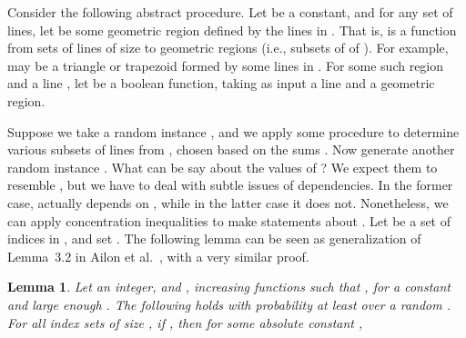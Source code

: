 \documentclass[letterpaper,11pt]{article}
\newtheorem{lemma}[theorem]{Lemma}
\newcommand{\etal}{et al.}
\begin{document}
Consider the following abstract 
procedure. Let  be a constant,
and for any set  of  lines, 
let  be some geometric region
defined by the lines in .
That is,  is a function
from sets of lines of size  to 
geometric regions (i.e., subsets of
of ). For example, 
may be a triangle or trapezoid formed 
by some lines in . For some such 
region  and a line , let 
 be a boolean
function, taking as input a line 
and a geometric region.

Suppose we take a random 
instance , and we 
apply some procedure to determine 
various subsets  
of  lines from , 
chosen based on 
the sums  
.
Now generate another random 
instance . What
can be say about the values of 
? 
We expect them to resemble 
, 
but we have to deal with
subtle issues of dependencies. 
In the former case,  actually 
depends on , while in the 
latter case it does not. 
Nonetheless, we can apply 
concentration inequalities
to make statements about 
.
Let  be a set 
of  indices in , and 
set .
The following lemma can be 
seen as generalization of Lemma~3.2 in 
Ailon \etal~\cite{AilonCCLMS11}, with
a very similar proof.

\begin{lemma}\label{lem:rand-const} 
  Let  an integer, and 
  ,  increasing 
  functions such that 
  ,
  for a constant  and large enough
  . The 
  following holds with probability at 
  least  over a random 
  .  For all index sets 
   of size , if 
  , 
  then for some absolute constant ,
  
\end{lemma}
\end{document}
